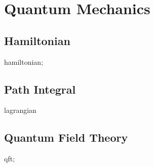 \chapter{Quantum Mechanics}\label{chp:quantum_mechanics}
\minitoc

\section{Hamiltonian}
\gls{hamiltonian};

\section{Path Integral}
\gls{lagrangian}

\section{Quantum Field Theory}
\gls{qft};